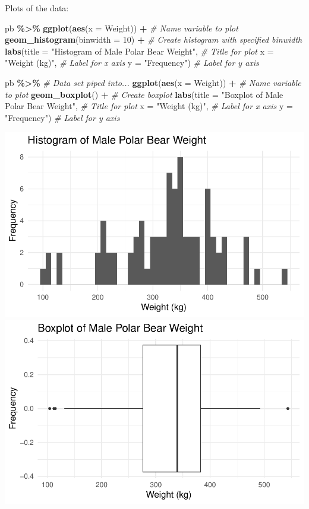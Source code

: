 \documentclass[
]{report}
\newenvironment{Shaded}{\begin{snugshade}}{\end{snugshade}}
\newcommand{\AttributeTok}[1]{\textcolor[rgb]{0.13,0.29,0.53}{#1}}
\newcommand{\CommentTok}[1]{\textcolor[rgb]{0.56,0.35,0.01}{\textit{#1}}}
\newcommand{\DecValTok}[1]{\textcolor[rgb]{0.00,0.00,0.81}{#1}}
\newcommand{\FunctionTok}[1]{\textcolor[rgb]{0.13,0.29,0.53}{\textbf{#1}}}
\newcommand{\NormalTok}[1]{#1}
\newcommand{\SpecialCharTok}[1]{\textcolor[rgb]{0.81,0.36,0.00}{\textbf{#1}}}
\newcommand{\StringTok}[1]{\textcolor[rgb]{0.31,0.60,0.02}{#1}}
\begin{document}
Plots of the data:

\begin{Shaded}
\begin{Highlighting}[]
\NormalTok{pb }\SpecialCharTok{\%\textgreater{}\%}
    \FunctionTok{ggplot}\NormalTok{(}\FunctionTok{aes}\NormalTok{(}\AttributeTok{x =}\NormalTok{ Weight)) }\SpecialCharTok{+}   \CommentTok{\# Name variable to plot}
    \FunctionTok{geom\_histogram}\NormalTok{(}\AttributeTok{binwidth =} \DecValTok{10}\NormalTok{) }\SpecialCharTok{+}  \CommentTok{\# Create histogram with specified binwidth}
    \FunctionTok{labs}\NormalTok{(}\AttributeTok{title =} \StringTok{"Histogram of Male Polar Bear Weight"}\NormalTok{, }\CommentTok{\# Title for plot}
       \AttributeTok{x =} \StringTok{"Weight (kg)"}\NormalTok{, }\CommentTok{\# Label for x axis}
       \AttributeTok{y =} \StringTok{"Frequency"}\NormalTok{) }\CommentTok{\# Label for y axis}

\NormalTok{pb }\SpecialCharTok{\%\textgreater{}\%} \CommentTok{\# Data set piped into...}
\FunctionTok{ggplot}\NormalTok{(}\FunctionTok{aes}\NormalTok{(}\AttributeTok{x =}\NormalTok{ Weight)) }\SpecialCharTok{+}   \CommentTok{\# Name variable to plot}
  \FunctionTok{geom\_boxplot}\NormalTok{() }\SpecialCharTok{+}  \CommentTok{\# Create boxplot}
  \FunctionTok{labs}\NormalTok{(}\AttributeTok{title =} \StringTok{"Boxplot of Male Polar Bear Weight"}\NormalTok{, }\CommentTok{\# Title for plot}
       \AttributeTok{x =} \StringTok{"Weight (kg)"}\NormalTok{, }\CommentTok{\# Label for x axis}
       \AttributeTok{y =} \StringTok{"Frequency"}\NormalTok{) }\CommentTok{\# Label for y axis}
\end{Highlighting}
\end{Shaded}

\begin{center}\includegraphics[width=0.6\linewidth]{07-VN07-one_meantheory_files/figure-latex/unnamed-chunk-2-1} \includegraphics[width=0.6\linewidth]{07-VN07-one_meantheory_files/figure-latex/unnamed-chunk-2-2} \end{center}
\end{document}
